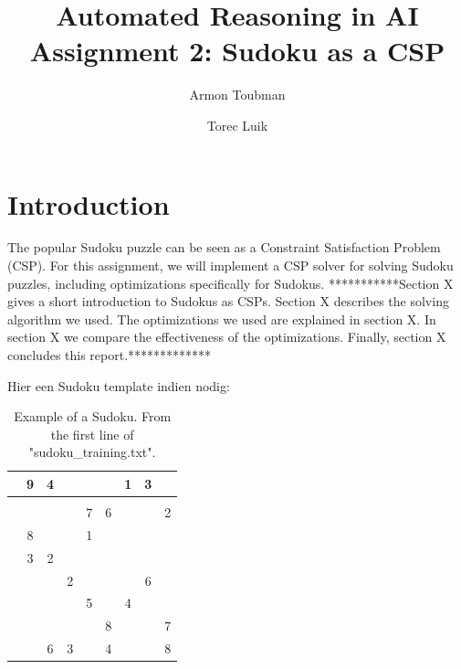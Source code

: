 \documentclass[11pt]{article} %
\title{Automated Reasoning in AI\\
Assignment 2: Sudoku as a CSP}
\author{Armon Toubman \and Torec Luik}
\begin{document}
\maketitle

\section{Introduction}

The popular Sudoku puzzle can be seen as a Constraint Satisfaction Problem (CSP). For this assignment, we will implement a CSP solver for solving Sudoku puzzles, including optimizations specifically for Sudokus. ***********Section X gives a short introduction to Sudokus as CSPs. Section X describes the solving algorithm we used. The optimizations we used are explained in section X. In section X we compare the effectiveness of the optimizations. Finally, section X concludes this report.*************%

Hier een Sudoku template indien nodig:
\begin{table}[htbp]
\caption{Example of a Sudoku. From the first line of "sudoku\_training.txt". }
    \label{tab:sudoku_initial}

    \begin{center}
        \begin{tabular}{||c|c|c||c|c|c||c|c|c||}
        \hline
        \hline
         & 9 & 4 &  &  &  & 1 & 3 & \\
        \hline
         &  &  &  &  &  &  &  & \\
        \hline
         &  &  &  & 7 & 6 &  &  & 2\\
        \hline
        \hline
         & 8 &  &  & 1 &  &  &  & \\
        \hline
         & 3 & 2 &  &  &  &  &  & \\
        \hline
         &  &  & 2 &  &  &  & 6 & \\
        \hline
        \hline
         &  &  &  & 5 &  & 4 &  & \\
        \hline
         &  &  &  &  & 8 &  &  & 7\\
        \hline
         &  & 6 & 3 &  & 4 &  &  & 8\\
        \hline
        \hline
        \end{tabular}
    \end{center}
\end{table}
\end{document}
